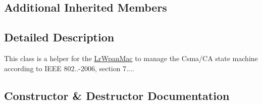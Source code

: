 \subsection*{Additional Inherited Members}


\subsection{Detailed Description}
This class is a helper for the \hyperlink{classns3_1_1LrWpanMac}{Lr\+Wpan\+Mac} to manage the Csma/\+CA state machine according to I\+E\+EE 802..-\/2006, section 7.... 

\subsection{Constructor \& Destructor Documentation}
